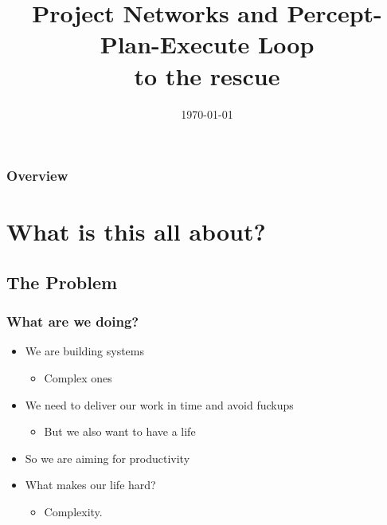\documentclass{beamer}
\title[PPER]{Project Networks and Percept-Plan-Execute Loop \\ to the rescue}
\institute[Septimal Mind]
    {
    Septimal Mind Ltd.\\
    \medskip
    \textit{team@7mind.io}
    }
\date{\today}
\begin{document}
    
    \begin{frame}
    \titlepage
    \end{frame}
    
    \begin{frame}
    \frametitle{Overview} %
    \tableofcontents %
    \end{frame}
    
\section{What is this all about?}
\subsection{The Problem}

\begin{frame}
    \frametitle{What are we doing?}
    \begin{itemize}
        \item We are building systems   
          \begin{itemize}
            \item Complex ones
          \end{itemize}
        \item We need to deliver our work in time and avoid fuckups
          \begin{itemize}
            \item But we also want to have a life
          \end{itemize}        
        \item So we are aiming for productivity

        \item What makes our life hard?
        \begin{itemize}
            \item Complexity.
          \end{itemize}        
    \end{itemize}    
 \end{frame}
\end{document}
